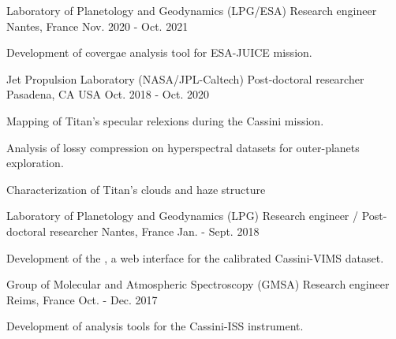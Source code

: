 
\begin{cventries}

  \cventry
  {Laboratory of Planetology and Geodynamics (LPG/ESA)}
  {Research engineer}
  {Nantes, France}
  {Nov. 2020 - Oct. 2021}
  {
    \begin{cvitems}
      \item{Development of covergae analysis tool for ESA-JUICE mission.}
    \end{cvitems}
    \vspace{1em}
  }

  \cventry
    {Jet Propulsion Laboratory (NASA/JPL-Caltech)}
    {Post-doctoral researcher}
    {Pasadena, CA USA}
    {Oct. 2018 - Oct. 2020}
    {
      \begin{cvitems}
        \item{Mapping of Titan's specular relexions during the Cassini mission.}
        \item{Analysis of lossy compression on hyperspectral datasets for outer-planets exploration.}
        \item{Characterization of Titan's clouds and haze structure}
      \end{cvitems}
      \vspace{1em}
    }

  \cventry
    {Laboratory of Planetology and Geodynamics (LPG)}
    {Research engineer / Post-doctoral researcher}
    {Nantes, France}
    {Jan. - Sept. 2018}
    {
      \begin{cvitems}
        \item{Development of the
        ,
        a web interface for the calibrated Cassini-VIMS dataset.}
      \end{cvitems}
      \vspace{1em}
    }

  \cventry
    {Group of Molecular and Atmospheric Spectroscopy (GMSA)}
    {Research engineer}
    {Reims, France}
    {Oct. - Dec. 2017}
    {
      \begin{cvitems}
        \item{Development of analysis tools for the Cassini-ISS instrument.}
      \end{cvitems}
      \vspace{1em}
    }

\end{cventries}
